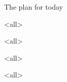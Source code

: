 \textbf{}
\begin{paracol}{2}

\begin{rightcolumn}

\begin{frame}
\titlepage
\end{frame}

\begin{frame}{The plan for today}
\tableofcontents
\end{frame}

%


%


\mode<all>

\mode*

\newpage

\mode<all>

\mode*

\clearpage


\mode*

\clearpage

\mode<all>

\mode*

\mode<all>

\mode*


\end{rightcolumn}
\end{paracol}


